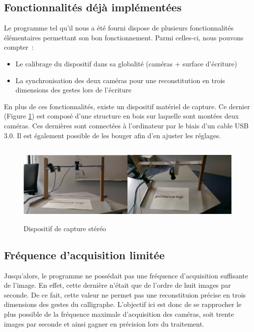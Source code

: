 \subsection{Fonctionnalités déjà implémentées}

Le programme tel qu'il nous a été fourni dispose de plusieurs fonctionnalités élémentaires permettant son bon fonctionnement. Parmi celles-ci, nous pouvons compter~:
\begin{itemize}
\item Le calibrage du dispositif dans sa globalité (caméras + surface d'écriture)
\item La synchronisation des deux caméras pour une reconstitution en trois dimensions des gestes lors de l'écriture
\end{itemize}
En plus de ces fonctionnalités, existe un dispositif matériel de capture. Ce dernier (Figure \ref{cameras}) est composé d'une structure en bois sur laquelle sont montées deux caméras. Ces dernières sont connectées à l'ordinateur par le biais d'un cable USB 3.0. Il est également possible de les bouger afin d'en ajuster les réglages.

\begin{figure}[!h]
\centering
\includegraphics[width=\textwidth, height=4cm]{Modules/Picture/camerasPic.png}
\caption{Dispositif de capture stéréo}
\label{cameras}
\end{figure}

\subsection{Fréquence d'acquisition limitée}

Jusqu'alors, le programme ne possédait pas une fréquence d'acquisition suffisante de l'image. En effet, cette dernière n'était que de l'ordre de huit images par seconde. De ce fait, cette valeur ne permet pas une reconstituion précise en trois dimensions des gestes du calligraphe. L'objectif ici est donc de se rapprocher le plus possible de la fréquence maximale d'acquisition des caméras, soit trente images par seconde et ainsi gagner en précision lors du traitement.

